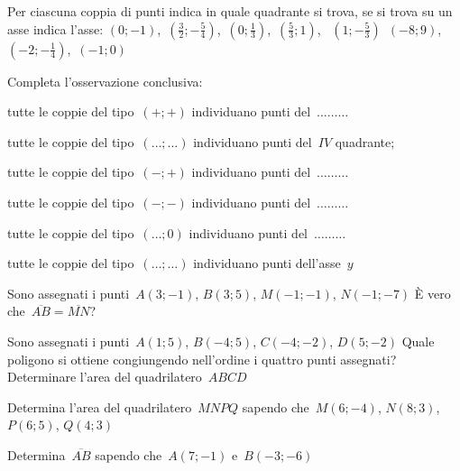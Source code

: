 \begin{esercizio}
\label{ese:D.18}
Per ciascuna coppia di punti indica in quale quadrante si trova, se si trova su un asse indica l'asse:
\((0;-1)\), \,\(\left(\frac{3}{2};-\frac{5}{4}\right)\), \,\(\left(0;\frac{1}{3}\right)\), \,\(\left(\frac{5}{3};1\right)\), \,
\(\left(1;-\frac{5}{3}\right)\) \,\((-8;9)\), \,\(\left(-2;-\frac{1}{4}\right)\), \,\((-1;0)\)

Completa l'osservazione conclusiva:
\begin{itemize*}
\item tutte le coppie del tipo~\((+;+)\) individuano punti del~\(\ldots \ldots \ldots\)
\item tutte le coppie del tipo~\((\ldots;\ldots)\) individuano punti del~\(IV\) quadrante;
\item tutte le coppie del tipo~\((-;+)\) individuano punti del~\(\ldots \ldots \ldots\)
\item tutte le coppie del tipo~\((-;-)\) individuano punti del~\(\ldots \ldots \ldots\)
\item tutte le coppie del tipo~\((\ldots;0)\) individuano punti del~\(\ldots \ldots \ldots\)
\item tutte le coppie del tipo~\((\ldots;\ldots)\) individuano punti dell'asse~\(y\)
\end{itemize*}
\end{esercizio}

\begin{esercizio}
\label{ese:D.19}
Sono assegnati i punti~\(A(3;-1)\), \(B(3;5)\), \(M(-1;-1)\), \(N(-1;-7)\) È vero che~\(\overline{AB}=\overline{MN}\)?
\end{esercizio}

\begin{esercizio}
\label{ese:D.20}
Sono assegnati i punti~\(A(1;5)\), \(B(-4;5)\), \(C(-4;-2)\), \(D(5;-2)\) Quale poligono si ottiene congiungendo nell'ordine i quattro
punti assegnati? Determinare l'area del quadrilatero~\(ABCD\)
\end{esercizio}

\begin{esercizio}
\label{ese:D.21}
Determina l'area del quadrilatero~\(MNPQ\) sapendo che~\(M(6;-4)\), \(N(8;3)\), \(P(6;5)\), \(Q(4;3)\)
\end{esercizio}

\begin{esercizio}
\label{ese:D.22}
Determina~\(\overline{AB}\) sapendo che~\(A(7;-1)\) e~\(B(-3;-6)\)
\end{esercizio}

